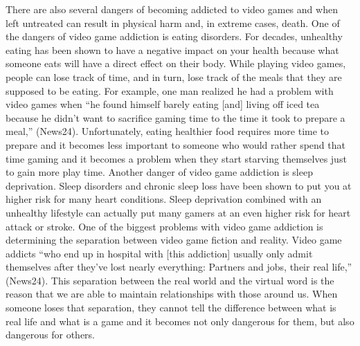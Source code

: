 \documentclass[a4paper,man,natbib]{apa6}
\renewcommand{\paragraph}{}
\begin{document}
\paragraph{}
There are also several dangers of becoming addicted to video games and when left untreated can result in physical harm and, in extreme cases, death. One of the dangers of video game addiction is eating disorders. For decades, unhealthy eating has been shown to have a negative impact on your health because what someone eats will have a direct effect on their body. While playing video games, people can lose track of time, and in turn, lose track of the meals that they are supposed to be eating. For example, one man realized he had a problem with video games when “he found himself barely eating [and] living off iced tea because he didn't want to sacrifice gaming time to the time it took to prepare a meal,” (News24). Unfortunately, eating healthier food requires more time to prepare and it becomes less important to someone who would rather spend that time gaming and it becomes a problem when they start starving themselves just to gain more play time. Another danger of video game addiction is sleep deprivation. Sleep disorders and chronic sleep loss have been shown to put you at higher risk for many heart conditions. Sleep deprivation combined with an unhealthy lifestyle can actually put many gamers at an even higher risk for heart attack or stroke. One of the biggest problems with video game addiction is determining the separation between video game fiction and reality. Video game addicts “who end up in hospital with [this addiction] usually only admit themselves after they've lost nearly everything: Partners and jobs, their real life,” (News24). This separation between the real world and the virtual word is the reason that we are able to maintain relationships with those around us. When someone loses that separation, they cannot tell the difference between what is real life and what is a game and it becomes not only dangerous for them, but also dangerous for others.
\end{document}
